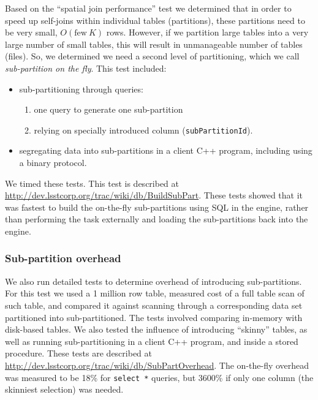 \documentclass[DM,lsstdraft,toc]{lsstdoc}
\begin{document}
Based on the ``spatial join performance'' test we determined that in
order to speed up self-joins within individual tables (partitions),
these partitions need to be very small, \(O(\mathrm{few~} K)\) rows.
However, if we partition large tables into a very large number of small
tables, this will result in unmanageable number of tables (files). So,
we determined we need a second level of partitioning, which we call
\emph{sub-partition on the fly}. This test included:

\begin{itemize}
\item
  sub-partitioning through queries:

  \begin{enumerate}
  \def\labelenumi{\arabic{enumi}.}
  \item
    one query to generate one sub-partition
  \item
    relying on specially introduced column (\texttt{subPartitionId}).
  \end{enumerate}
\item
  segregating data into sub-partitions in a client C++ program,
  including using a binary protocol.
\end{itemize}

We timed these tests. This test is described at
\url{http://dev.lsstcorp.org/trac/wiki/db/BuildSubPart}. These tests
showed that it was fastest to build the on-the-fly sub-partitions using
SQL in the engine, rather than performing the task externally and
loading the sub-partitions back into the engine.

\subsubsection{Sub-partition overhead}\label{sub-partition-overhead}

We also run detailed tests to determine overhead of introducing
sub-partitions. For this test we used a 1 million row table, measured
cost of a full table scan of such table, and compared it against
scanning through a corresponding data set partitioned into
sub-partitioned. The tests involved comparing in-memory with disk-based
tables. We also tested the influence of introducing ``skinny'' tables,
as well as running sub-partitioning in a client C++ program, and inside
a stored procedure. These tests are described at
\url{http://dev.lsstcorp.org/trac/wiki/db/SubPartOverhead}. The
on-the-fly overhead was measured to be 18\% for \texttt{select\ *}
queries, but 3600\% if only one column (the skinniest selection) was
needed.
\end{document}
